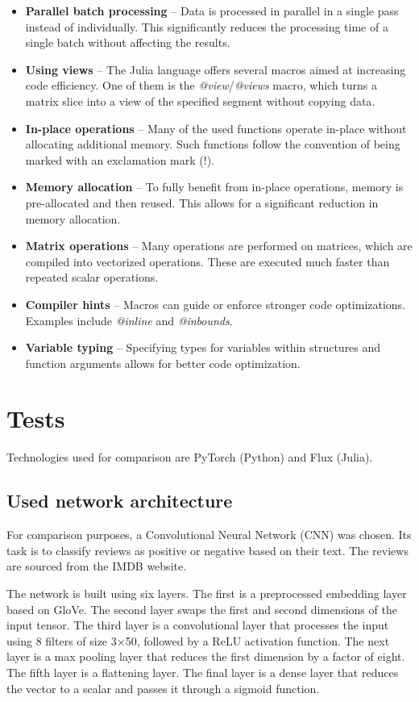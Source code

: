 \documentclass[conference]{IEEEtran}
\begin{document}
\begin{itemize}
    \item \textbf{Parallel batch processing} – Data is processed in parallel in a single pass instead of individually. This significantly reduces the processing time of a single batch without affecting the results.
    \item \textbf{Using views} – The Julia language offers several macros aimed at increasing code efficiency. One of them is the \textit{@view}/\textit{@views} macro, which turns a matrix slice into a view of the specified segment without copying data.
    \item \textbf{In-place operations} – Many of the used functions operate in-place without allocating additional memory. Such functions follow the convention of being marked with an exclamation mark (!).
    \item \textbf{Memory allocation} – To fully benefit from in-place operations, memory is pre-allocated and then reused. This allows for a significant reduction in memory allocation.
    \item \textbf{Matrix operations} – Many operations are performed on matrices, which are compiled into vectorized operations. These are executed much faster than repeated scalar operations.
    \item \textbf{Compiler hints} – Macros can guide or enforce stronger code optimizations. Examples include \textit{@inline} and \textit{@inbounds}.
    \item \textbf{Variable typing} – Specifying types for variables within structures and function arguments allows for better code optimization.
\end{itemize}

\section{Tests}
Technologies used for comparison are PyTorch (Python) and Flux (Julia).

\subsection{Used network architecture}

For comparison purposes, a Convolutional Neural Network (CNN) was chosen. Its task is to classify reviews as positive or negative based on their text. The reviews are sourced from the IMDB website.

The network is built using six layers. The first is a preprocessed embedding layer based on GloVe. The second layer swaps the first and second dimensions of the input tensor. The third layer is a convolutional layer that processes the input using 8 filters of size 3×50, followed by a ReLU activation function. The next layer is a max pooling layer that reduces the first dimension by a factor of eight. The fifth layer is a flattening layer. The final layer is a dense layer that reduces the vector to a scalar and passes it through a sigmoid function.
\end{document}
